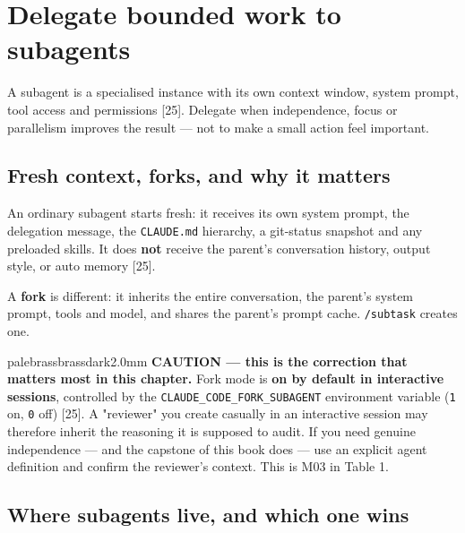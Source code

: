 \documentclass[11pt,a4paper,twoside,openany]{book}
\newcommand{\chaptertitlelabel}{}
\begin{document}
\FloatBarrier
\renewcommand{\chaptertitlelabel}{Part IV \textperiodcentered\ Chapter 16}
\setcounter{chapter}{15}
\chapter{Delegate bounded work to subagents}

A subagent is a specialised instance with its own context window, system prompt, tool access and permissions [25]. Delegate when independence, focus or parallelism improves the result — not to make a small action feel important.


\FloatBarrier
\setcounter{section}{0}
\section{Fresh context, forks, and why it matters}

An ordinary subagent starts fresh: it receives its own system prompt, the delegation message, the \texttt{CLAUDE.\allowbreak{}md} hierarchy, a git-status snapshot and any preloaded skills. It does \textbf{not} receive the parent's conversation history, output style, or auto memory [25].


A \textbf{fork} is different: it inherits the entire conversation, the parent's system prompt, tools and model, and shares the parent's prompt cache. \texttt{/\allowbreak{}subtask} creates one.


\begin{calloutbox}{palebrass}{brassdark}{2.0mm}
\textbf{CAUTION — this is the correction that matters most in this chapter.} Fork mode is \textbf{on by default in interactive sessions}, controlled by the \texttt{CLAUDE\_\allowbreak{}CODE\_\allowbreak{}FORK\_\allowbreak{}SUBAGENT} environment variable (\texttt{1} on, \texttt{0} off) [25]. A "reviewer" you create casually in an interactive session may therefore inherit the reasoning it is supposed to audit. If you need genuine independence — and the capstone of this book does — use an explicit agent definition and confirm the reviewer's context. This is M03 in Table 1.
\end{calloutbox}

\FloatBarrier
\setcounter{section}{1}
\section{Where subagents live, and which one wins}
\end{document}
